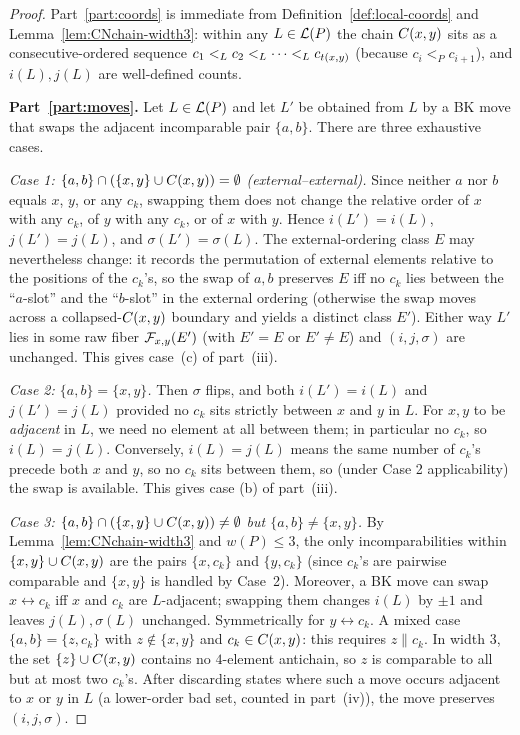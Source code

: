 \begin{proof}
Part~\ref{part:coords} is immediate from Definition~\ref{def:local-coords}
and Lemma~\ref{lem:CNchain-width3}: within any $L\in\mathcal{L}(P)$ the chain $C(x,y)$
sits as a consecutive-ordered sequence $c_1<_L c_2<_L\dots<_L c_{t(x,y)}$
(because $c_i<_P c_{i+1}$), and $i(L),j(L)$ are well-defined counts.

\smallskip
\textbf{Part~\ref{part:moves}.}
Let $L\in\mathcal{L}(P)$ and let $L'$ be obtained from $L$ by a BK move that swaps the
adjacent incomparable pair $\{a,b\}$. There are three exhaustive cases.

\emph{Case 1: $\{a,b\}\cap(\{x,y\}\cup C(x,y))=\emptyset$ (external--external).}
Since neither $a$ nor $b$ equals $x$, $y$, or any $c_k$, swapping them does
not change the relative order of $x$ with any $c_k$, of $y$ with any $c_k$,
or of $x$ with $y$. Hence $i(L')=i(L)$, $j(L')=j(L)$, and
$\sigma(L')=\sigma(L)$. The external-ordering class $E$ may nevertheless
change: it records the permutation of external elements relative to the
positions of the $c_k$'s, so the swap of $a,b$ preserves $E$ iff no $c_k$
lies between the ``$a$-slot'' and the ``$b$-slot'' in the external ordering
(otherwise the swap moves across a collapsed-$C(x,y)$ boundary and yields a
distinct class $E'$). Either way $L'$ lies in some raw fiber $\mathcal{F}_{x,y}(E')$ (with $E'=E$ or
$E'\ne E$) and $(i,j,\sigma)$ are unchanged. This gives case~(c) of
part~(iii).

\emph{Case 2: $\{a,b\}=\{x,y\}$.}
Then $\sigma$ flips, and both $i(L')=i(L)$ and $j(L')=j(L)$ provided no
$c_k$ sits strictly between $x$ and $y$ in $L$. For $x,y$ to be
\emph{adjacent} in $L$, we need no element at all between them; in particular
no $c_k$, so $i(L)=j(L)$. Conversely, $i(L)=j(L)$ means the same number of
$c_k$'s precede both $x$ and $y$, so no $c_k$ sits between them, so (under
Case 2 applicability) the swap is available. This gives case (b) of part~(iii).

\emph{Case 3: $\{a,b\}\cap(\{x,y\}\cup C(x,y))\ne\emptyset$ but $\{a,b\}\ne\{x,y\}$.}
By Lemma~\ref{lem:CNchain-width3} and $w(P)\le 3$, the only incomparabilities
within $\{x,y\}\cup C(x,y)$ are the pairs $\{x,c_k\}$ and $\{y,c_k\}$ (since
$c_k$'s are pairwise comparable and $\{x,y\}$ is handled by Case~2).
Moreover, a BK move can swap $x\leftrightarrow c_k$ iff $x$ and $c_k$ are
$L$-adjacent; swapping them changes $i(L)$ by $\pm 1$ and leaves
$j(L),\sigma(L)$ unchanged. Symmetrically for $y\leftrightarrow c_k$.
A mixed case $\{a,b\}=\{z,c_k\}$ with $z\notin\{x,y\}$ and $c_k\in C(x,y)$:
this requires $z\parallel c_k$. In width $3$, the set $\{z\}\cup C(x,y)$ contains
no $4$-element antichain, so $z$ is comparable to all but at most two $c_k$'s.
After discarding states where such a move occurs adjacent to $x$ or $y$ in
$L$ (a lower-order bad set, counted in part~(iv)), the move preserves
$(i,j,\sigma)$.


\end{proof}
